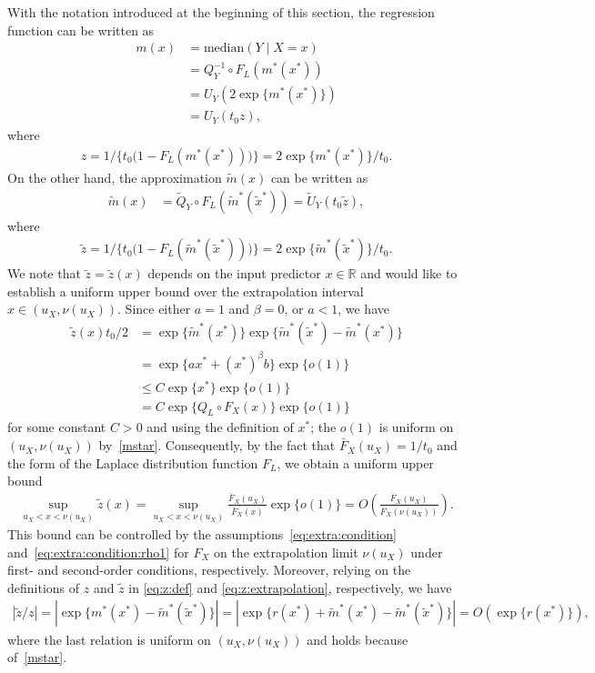 \documentclass{statsoc}
\theoremstyle{break}
\newcommand{\tzero}{t_0}
\newcommand{\beam}{\begin{eqnarray}}
\newcommand{\eeam}{\end{eqnarray}\noindent}
\begin{document}
With the notation introduced at the beginning of this section, the regression function can be written as
\begin{align*} 
	m(x) &= \text{median}( Y \mid X = x) \\ 
	&= Q_Y^{-1} \circ F_L( m^*(x^*) )\\
	& = U_Y(2\exp\{m^*(x^*)\})\\
	& = U_Y(\tzero z),
\end{align*}
where  
\beam \label{eq:z:def}
z= 1/\big\{t_0 \big(1-F_L( m^*( x^*))\big)\big\} = 2\exp\{m^*(x^*)\}/t_0.
\eeam 
 On the other hand, the approximation $\tilde m(x)$ can be written as
\begin{align}\label{eq:ftilde:rewritting}
	\tilde m(x) &= \tilde Q_Y \circ F_L(\tilde m^*(\tilde x^*)) = \tilde U_Y(t_0 \tilde z),
\end{align}
where 
\beam \label{eq:z:extrapolation}
\tilde z = 1/\big\{t_0 \big(1-F_L( \tilde m^*( \tilde x^*))\big)\big\} = 2 \exp\{ \tilde m^*(\tilde x^*)\}/t_0.
\eeam
We note that $\tilde z = \tilde z(x)$ depends on the input predictor $x\in\mathbb R$ and would like to establish a uniform upper bound over the extrapolation interval $x\in (u_X,\nu(u_X))$.
 Since either $a=1$ and $\beta = 0$, or $a<1$, we have 
\begin{align}\label{bound:z} 
	\tilde z(x)t_0 /2 & = \exp\{ \tilde m^*( x^*)\}\exp\{ \tilde m^*(\tilde x^*) - \tilde m^*( x^*)\}\\
	& = \exp\{ a x^* + (x^*)^\beta b\}\exp\{ o(1)\} \\
	&\leq C \exp\{ x^*\}\exp\{ o(1)\} \\
	& = C \exp\{ Q_L\circ F_X(x) \}\exp\{ o(1)\} 	
\end{align}
for some constant $C>0$ and using the definition of $x^*$; the $o(1)$ is uniform on $(u_X, \nu(u_X))$ by~\eqref{mstar}. Consequently, by the fact that $\bar F_X(u_X) = 1/t_0$ and the form of the Laplace distribution function $F_L$, we obtain a uniform upper bound
\begin{align}\label{bound:z_unif} 
	\sup_{u_X < x < \nu(u_X)} \tilde z(x) = \sup_{u_X < x < \nu(u_X)} \frac{\bar F_X(u_X)}{\bar F_X(x)}\exp\{o(1)\} = O\left(\frac{\bar F_X(u_X)}{\bar F_X(\nu(u_X))} \right).	
\end{align}
This bound can be controlled by the assumptions~\eqref{eq:extra:condition} and~\eqref{eq:extra:condition:rho1} for $F_X$ on the extrapolation limit $\nu(u_X)$ under first- and second-order conditions, respectively.
Moreover, relying on the definitions of $z$ and $\tilde z $ in \eqref{eq:z:def} and \eqref{eq:z:extrapolation}, respectively,  we have
\begin{align}\label{eq:diff:medians}
	|\tilde z/z| = |\exp\{m^*(x^*) - \tilde m^*(\tilde x^*)\}| =
	|\exp\{r(x^*) + \tilde m^*(x^*) - \tilde m^*(\tilde x^*)\}| =
	O(\exp\{r(x^*)\}),
\end{align}
where the last relation is uniform on $(u_X,\nu(u_X))$ and holds because of~\eqref{mstar}.
\end{document}
